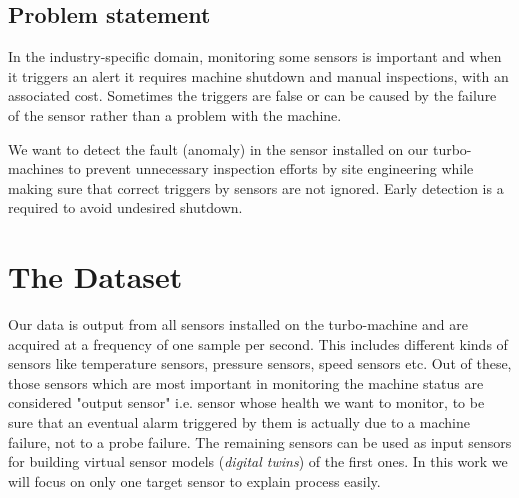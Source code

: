 \documentclass[runningheads]{llncs}
\begin{document}
\subsection{Problem statement}
In the industry-specific domain,  monitoring some sensors is important and when it triggers an alert it requires machine shutdown and manual inspections, with an associated cost. Sometimes the triggers are false or can be caused by the failure of the sensor rather than a problem with the machine.

We want to detect the fault (anomaly) in the sensor installed on our turbo-machines to prevent unnecessary inspection efforts by site engineering while making sure that correct triggers by sensors are not ignored. Early detection is a required to avoid undesired shutdown.






\section{The Dataset}
Our data is output from all sensors installed on the turbo-machine and are acquired at a frequency of one sample per second. This includes different kinds of sensors like temperature sensors, pressure sensors, speed sensors etc. Out of these, those sensors which are most important in monitoring the machine status are considered "output sensor" i.e. sensor whose health we want to monitor, to be sure that an eventual alarm triggered by them is actually due to a machine failure, not to a probe failure. The remaining sensors can be used as input sensors for building virtual sensor models (\textit{digital twins}) of the first ones. In this work we will focus on only one target sensor to explain process easily.\\
\end{document}
